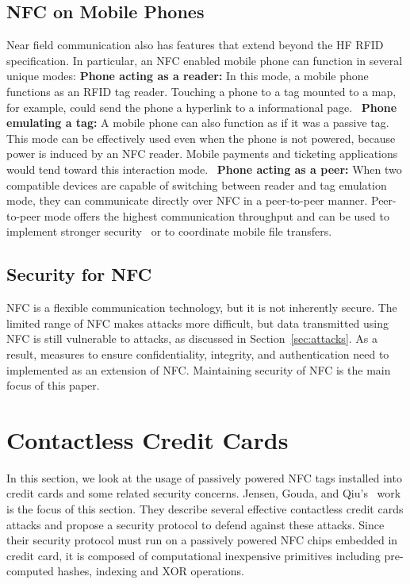 \documentclass{sig-alternate}
\begin{document}
\subsection{NFC on Mobile Phones}
\label{sec:nfcOnPhones}
Near field communication also has features that extend beyond the HF RFID specification. In particular, an NFC enabled mobile phone can function in several unique modes:
\vspace{2mm}\newline
\textbf{Phone acting as a reader:}
In this mode, a mobile phone functions as an RFID tag reader. Touching a phone to a tag mounted to a map, for example, could send the phone a hyperlink to a informational page.~\cite{staticDynamicDisplays}
\vspace{2mm}\newline
\textbf{Phone emulating a tag:}
A mobile phone can also function as if it was a passive tag. This mode can be effectively used even when the phone is not powered, because power is induced by an NFC reader. Mobile payments and ticketing applications would tend toward this interaction mode.~\cite{Gum2013}
\vspace{2mm}\newline
\textbf{Phone acting as a peer:}
When two compatible devices are capable of switching between reader and tag emulation mode, they can communicate directly over NFC in a peer-to-peer manner. Peer-to-peer mode offers the highest communication throughput and can be used to implement stronger security~\cite{Ticket2011} or to coordinate mobile file transfers.~\cite{Gum2013}

\subsection{Security for NFC}
\label{sec:backgroundSecurity}
NFC is a flexible communication technology, but it is not inherently secure. The limited range of NFC makes attacks more difficult, but data transmitted using NFC is still vulnerable to attacks, as discussed in Section~\ref{sec:attacks}. As a result, measures to ensure confidentiality, integrity, and authentication need to implemented as an extension of NFC. Maintaining security of NFC is the main focus of this paper.~\cite{CC2016}



\section{Contactless Credit Cards}
\label{sec:creditCard}
In this section, we look at the usage of passively powered NFC tags installed into  credit cards and some related security concerns. Jensen, Gouda, and Qiu's~\cite{CC2016} work is the focus of this section. They describe several effective contactless credit cards attacks and propose a security protocol to defend against these attacks. Since their security protocol must run on a passively powered NFC chips embedded in credit card, it is composed of computational inexpensive primitives including pre-computed hashes, indexing and XOR operations.~\cite{CC2016}
\end{document}
